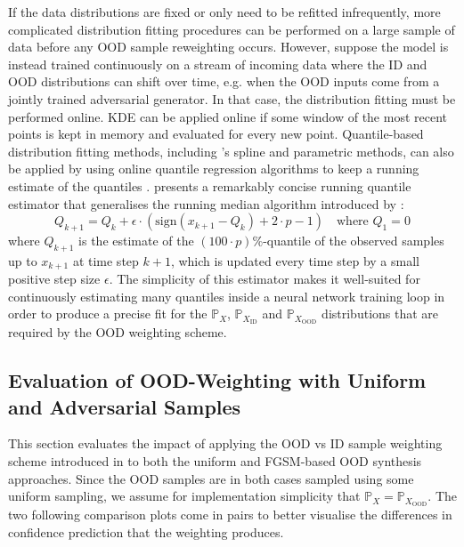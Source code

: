 \newpar If the data distributions are fixed or only need to be refitted infrequently, more complicated distribution fitting procedures can be performed on a large sample of data before any OOD sample reweighting occurs. However, suppose the model is instead trained continuously on a stream of incoming data where the ID and OOD distributions can shift over time, e.g. when the OOD inputs come from a jointly trained adversarial generator. In that case, the distribution fitting must be performed online. KDE can be applied online if some window of the most recent points is kept in memory and evaluated for every new point. Quantile-based distribution fitting methods, including \citeauthor{pdf-quantiles-2018}'s spline and parametric methods, can also be applied by using online quantile regression algorithms to keep a running estimate of the quantiles \cite{p2-quantile-1985, frugal-quantiles-2014, quantile-outlier-2020}. \textcite{online-median-2021} presents a remarkably concise running quantile estimator that generalises the running median algorithm introduced by \textcite{median-perceptron-1997}:
\begin{equation*}
    Q_{k+1} = Q_k + \epsilon \cdot (\text{sign}(x_{k+1} - Q_k) + 2 \cdot p - 1) \quad \text{where } Q_1 = 0
\end{equation*}
where $Q_{k+1}$ is the estimate of the $(100 \cdot p) \%$-quantile of the observed samples up to $x_{k+1}$ at time step $k+1$, which is updated every time step by a small positive step size $\epsilon$. The simplicity of this estimator makes it well-suited for continuously estimating many quantiles inside a neural network training loop in order to produce a precise fit for the $\mathbb{P}_X$, $\mathbb{P}_{X_{\text{ID}}}$ and $\mathbb{P}_{X_{\text{OOD}}}$ distributions that are required by the OOD weighting scheme.

\subsection{Evaluation of OOD-Weighting with Uniform and Adversarial Samples} \label{txt:weighted-ood-synthesis-analysis}

This section evaluates the impact of applying the OOD vs ID sample weighting scheme introduced in  to both the uniform and FGSM-based OOD synthesis approaches. Since the OOD samples are in both cases sampled using some uniform sampling, we assume for implementation simplicity that $\mathbb{P}_X = \mathbb{P}_{X_{\text{OOD}}}$. The two following comparison plots come in pairs to better visualise the differences in confidence prediction that the weighting produces.

